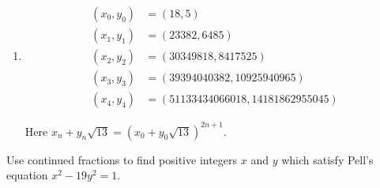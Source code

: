 \documentclass[12 pt, letterpaper]{hmcpset}
\begin{document}
\begin{solution}
\begin{enumerate}
			Here $x_{n} + y_{n} \sqrt{7} = (x_{0} + y_{0} \sqrt{7})^{n + 1}$.
		\item
			\[
				\boxed{
					\begin{split}
						(x_{0}, y_{0}) & = (18, 5) \\
						(x_{1}, y_{1}) & = (23382, 6485) \\
						(x_{2}, y_{2}) & = (30349818, 8417525) \\
						(x_{3}, y_{3}) & = (39394040382, 10925940965) \\
						(x_{4}, y_{4}) & = (51133434066018, 14181862955045)
					\end{split}
				}
			\]

			Here $x_{n} + y_{n} \sqrt{13} = (x_{0} + y_{0} \sqrt{13})^{2n + 1}$.
	\end{enumerate}
\end{solution}

\pagebreak

\begin{problem}[2]
	Use continued fractions to find positive integers $x$ and $y$ which satisfy Pell's equation $x^{2} - 19 y^{2} = 1$.
\end{problem}
\end{document}
